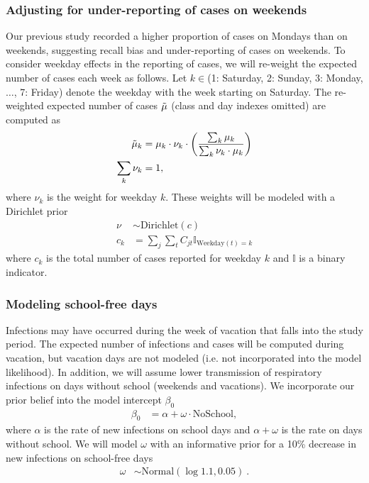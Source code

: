 \documentclass{article}
\begin{document}
\subsubsection*{Adjusting for under-reporting of cases on weekends}

Our previous study recorded a higher proportion of cases on Mondays than on weekends, suggesting recall bias and under-reporting of cases on weekends\cite{Banholzer2023}. To consider weekday effects in the reporting of cases, we will re-weight the expected number of cases each week as follows. Let $k \in $(1: Saturday, 2: Sunday, 3: Monday, $\dots$, 7: Friday) denote the weekday with the week starting on Saturday. The re-weighted expected number of cases $\Tilde{\mu}$ (class and day indexes omitted) are computed as
\begin{align*}
    \Tilde{\mu}_{k} &= \mu_k \cdot \nu_k \cdot \left(\frac{\sum_k \mu_k}{\sum_k \nu_k \cdot \mu_k}\right)\\
    \sum_k \nu_k &= 1,
\end{align*}
where $\nu_k$ is the weight for weekday $k$. These weights will be modeled with a Dirichlet prior
\begin{align*}
    \nu &\sim \text{Dirichlet}(c) \\
    c_k &= \sum_j \sum_t C_{jt} \mathbb{I}_{\text{Weekday}(t)=k}
\end{align*}
where $c_k$ is the total number of cases reported for weekday $k$ and $\mathbb{I}$ is a binary indicator. 

\subsubsection*{Modeling school-free days}

Infections may have occurred during the week of vacation that falls into the study period. The expected number of infections and cases will be computed during vacation, but vacation days are not modeled (i.e. not incorporated into the model likelihood). In addition, we will assume lower transmission of respiratory infections on days without school (weekends and vacations). We incorporate our prior belief into the model intercept $\beta_0$  
\begin{align*}
    \beta_0 &= \alpha + \omega \cdot \text{NoSchool},
\end{align*}
where $\alpha$ is the rate of new infections on school days and $\alpha + \omega$ is the rate on days without school. We will model $\omega$ with an informative prior for a 10\% decrease in new infections on school-free days
\begin{align*}
    \omega &\sim \text{Normal}(\log 1.1, 0.05)~.
\end{align*}
\end{document}
